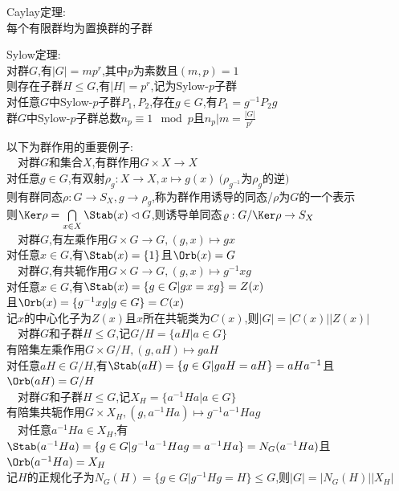 \begin{dingli}
Caylay定理:\\
每个有限群均为置换群的子群
\end{dingli}

\begin{dingli}
Sylow定理:\\
对群$G$,有$|G|=mp^r$,其中$p$为素数且$(m,p)=1$\\
则存在子群$H\leq G$,有$|H|=p^r$,记为Sylow-$p$子群\\
对任意$G$中Sylow-$p$子群$P_1,P_2$,存在$g\in G$,有$P_1=g^{-1}P_2g$\\
群$G$中Sylow-$p$子群总数$n_p\equiv 1\mod p$且$n_p|m=\frac{|G|}{p^r}$
\end{dingli}

\begin{liz}
以下为群作用的重要例子:\\
$\quad$对群$G$和集合$X$,有群作用$G\times X\to X$\\
对任意$g\in G$,有双射$\rho_g:X\to X,x\mapsto g(x)\ (\rho_{g^{-1}}$为$\rho_g$的逆$)$\\
则有群同态$\rho:G\to S_{X},g\to \rho_g$,称为群作用诱导的同态/$\rho$为$G$的一个表示\\
则$\Ker \rho=\bigcap\limits_{x\in X}\Stab(x)\lhd G$,则诱导单同态$\varrho:G/\Ker\rho\to S_{X}$\\
$\quad$对群$G$,有左乘作用$G\times G\to G,(g,x)\mapsto gx$\\
对任意$x\in G$,有$\Stab(x)=\{1\}$且$\Orb(x)=G$\\
$\quad$对群$G$,有共轭作用$G\times G\to G,(g,x)\mapsto g^{-1}xg$\\
对任意$x\in G$,有$\Stab(x)=\{g\in G|gx=xg\}=Z(x)$\\
且$\Orb(x)=\{g^{-1}xg|g\in G\}=C(x)$\\
记$x$的中心化子为$Z(x)$且$x$所在共轭类为$C(x)$,则$|G|=|C(x)||Z(x)|$\\
$\quad$对群$G$和子群$H\leq G$,记$G/H=\{aH|a\in G\}$\\
有陪集左乘作用$G\times G/H,(g,aH)\mapsto gaH$\\
对任意$aH\in G/H$,有$\Stab(aH)=\{g\in G|gaH=aH\}=aHa^{-1}$且$\Orb(aH)=G/H$\\
$\quad$对群$G$和子群$H\leq G$,记$X_{H}=\{a^{-1}Ha|a\in G\}$\\
有陪集共轭作用$G\times X_{H},(g,a^{-1}Ha)\mapsto g^{-1}a^{-1}Hag$\\
$\quad$对任意$a^{-1}Ha\in X_{H}$,有$\Stab(a^{-1}Ha)=\{g\in G|g^{-1}a^{-1}Hag=a^{-1}Ha\}=N_{G}(a^{-1}Ha)$且$\Orb(a^{-1}Ha)=X_{H}$\\
记$H$的正规化子为$N_{G}(H)=\{g\in G|g^{-1}Hg=H\}\leq G$,则$|G|=|N_G(H)||X_{H}|$
\end{liz}

